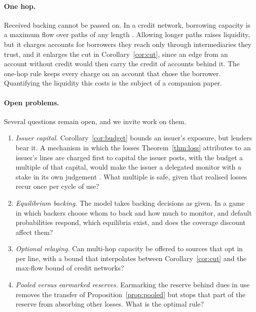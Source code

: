 \documentclass[acmsmall,nonacm,screen]{acmart}
\theoremstyle{acmdefinition}%
\begin{document}
\paragraph{One hop.} Received backing cannot be passed on. In a credit network, borrowing capacity is
a maximum flow over paths of any length \citep{dandekar2011liquidity}. Allowing longer paths raises
liquidity, but it charges accounts for borrowers they reach only through intermediaries they trust,
and it enlarges the cut in Corollary~\ref{cor:cut}, since an edge from an account without credit
would then carry the credit of accounts behind it. The one-hop rule keeps every charge on an account
that chose the borrower. Quantifying the liquidity this costs is the subject of a companion paper.

\paragraph{Open problems.} Several questions remain open, and we invite work on them.
\begin{enumerate}
\item \emph{Issuer capital.} Corollary~\ref{cor:budget} bounds an issuer's exposure, but lenders bear
  it. A mechanism in which the losses Theorem~\ref{thm:loss} attributes to an issuer's lines are
  charged first to capital the issuer posts, with the budget a multiple of that capital, would make
  the issuer a delegated monitor with a stake in its own judgement \citep{diamond1984delegated}.
  What multiple is safe, given that realised losses recur once per cycle of use?
\item \emph{Equilibrium backing.} The model takes backing decisions as given. In a game in which
  backers choose whom to back and how much to monitor, and default probabilities respond, which
  equilibria exist, and does the coverage discount affect them?
\item \emph{Optional relaying.} Can multi-hop capacity be offered to sources that opt in per line,
  with a bound that interpolates between Corollary~\ref{cor:cut} and the max-flow bound of credit
  networks?
\item \emph{Pooled versus earmarked reserves.} Earmarking the reserve behind dues in use removes the
  transfer of Proposition~\ref{prop:pooled} but stops that part of the reserve from absorbing other
  losses. What is the optimal rule?
\end{enumerate}

\end{document}
